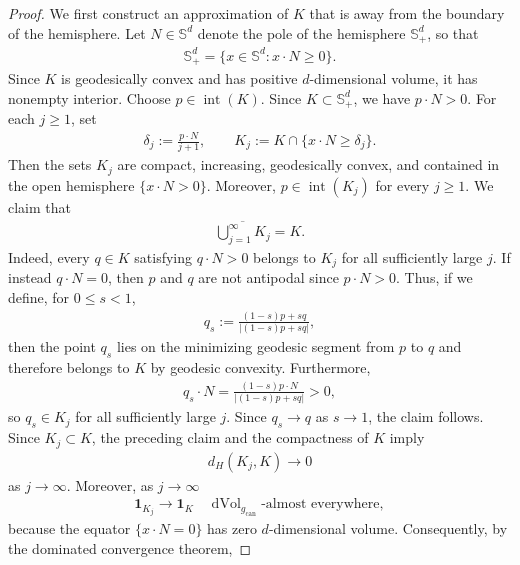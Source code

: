 \documentclass[10pt,a4paper]{amsart}
\def\bS {\mathbb{S}}
\newcommand{\can}{\mathrm{can}}
\newcommand{\dvol}{\operatorname{dVol}}
\begin{document}
\begin{proof}
We first construct an approximation of $K$ that is away from the boundary of the hemisphere. Let $N\in\bS^d$ denote the pole of the hemisphere $\bS^d_+$, so that
\begin{align}
        \bS^d_+
        =
        \{x\in\bS^d:x\cdot N\geq0\}.
\end{align}
Since $K$ is geodesically convex and has positive $d$-dimensional volume,
it has nonempty interior. Choose $p\in\operatorname{int}(K)$. Since $K\subset\bS^d_+$, we have
$p\cdot N>0$. For each $j\geq1$, set
\begin{align}
        \delta_j
        :=
        \frac{p\cdot N}{j+1},
        \qquad
        K_j
        :=
        K\cap\{x\cdot N\geq\delta_j\}.
\end{align}
Then the sets $K_j$ are compact, increasing, geodesically convex, and
contained in the open hemisphere $\{x\cdot N>0\}$. Moreover,
$p\in\operatorname{int}(K_j)$ for every $j\geq1$. We claim that
\begin{align}
        \overline{\bigcup_{j=1}^\infty K_j}
        =
        K.
\end{align}
Indeed, every $q\in K$ satisfying $q\cdot N>0$ belongs to $K_j$ for all
sufficiently large $j$. If instead $q\cdot N=0$, then $p$ and $q$ are not antipodal since $p\cdot N>0$. Thus, if we define, for $0\leq s<1$,
\begin{align}
        q_s
        :=
        \frac{(1-s)p+sq}{|(1-s)p+sq|},
\end{align}
then the point $q_s$ lies on the minimizing geodesic segment from $p$ to $q$ and
therefore belongs to $K$ by geodesic convexity. Furthermore,
\begin{align}
        q_s\cdot N
        =
        \frac{(1-s)p\cdot N}{|(1-s)p+sq|}
        >
        0,
\end{align}
so $q_s\in K_j$ for all sufficiently large $j$. Since $q_s\to q$ as
$s\to1$, the claim follows. Since $K_j\subset K$, the preceding claim and the compactness of $K$ imply
\begin{align}
        d_H(K_j,K)
        \rightarrow
        0
\end{align}
as $j\to \infty.$ Moreover, as $j\to \infty$
\begin{align}
        \mathbf{1}_{K_j}
        \rightarrow
        \mathbf{1}_K
        \quad
        \dvol_{g_{\can}}\text{-almost everywhere},
\end{align}
because the equator $\{x\cdot N=0\}$ has zero $d$-dimensional volume. Consequently, by the dominated convergence theorem,

\end{proof}
\end{document}
